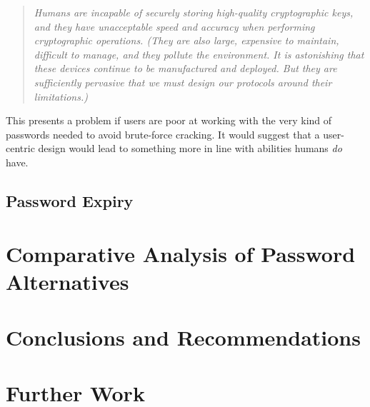 \documentclass{report}
\begin{document}
\begin{quotation}
  \emph{
  Humans are incapable of securely storing high-quality
  cryptographic keys, and they have unacceptable speed and
  accuracy when performing cryptographic operations. (They are
  also large, expensive to maintain, difficult to manage, and they
  pollute the environment. It is astonishing that these devices
  continue to be manufactured and deployed. But they are
  sufficiently pervasive that we must design our protocols around
  their limitations.)
  }
\end{quotation}

This presents a problem if users are poor at working with the
very kind of passwords needed to avoid brute-force cracking. It
would suggest that a user-centric design would lead to something
more in line with abilities humans \emph{do} have.

\section{Password Expiry}


\chapter{Comparative Analysis of Password Alternatives}
\label{chapter:alternatives}

\chapter{Conclusions and Recommendations}

\chapter{Further Work}

\printbibliography
\end{document}
